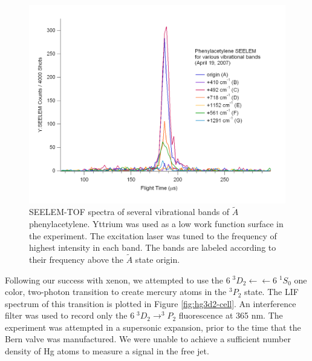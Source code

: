 \documentclass[12pt]{mitthesis}
\begin{document}
\begin{figure}
  \caption{SEELEM-TOF spectra of several vibrational bands of
    $\tilde{A}$ phenylacetylene.  Yttrium was used as a low work
    function surface in the experiment.  The excitation laser was
    tuned to the frequency of highest intensity in each band.  The
    bands are labeled according to their frequency above the
    $\tilde{A}$ state origin.}
  \label{fig:phenylacetylene-tofs}
  \centering
  \includegraphics[width=8in,angle=90]{phenylacetylene-tofs.pdf}
\end{figure}

Following our success with xenon, we attempted to use the $6\;^3D_2
\leftarrow \leftarrow 6\;^1S_0$ one color, two-photon transition to
create mercury atoms in the $^3P_2$ state.  The LIF spectrum of this
transition is plotted in Figure \ref{fig:hg3d2-cell}.  An interference
filter was used to record only the $6 \; ^3D_2 \rightarrow ^3P_2$
fluorescence at 365 nm.  The experiment was attempted in a supersonic
expansion, prior to the time that the Bern valve was manufactured.  We
were unable to achieve a sufficient number density of Hg atoms to
measure a signal in the free jet.
\end{document}
